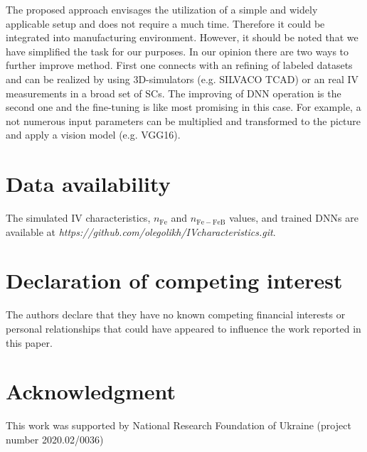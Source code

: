 \documentclass[a4paper,fleqn]{cas-sc}
\begin{document}
The proposed approach envisages
the utilization of a simple and widely applicable setup and
does not require a much time.
Therefore it could be integrated into manufacturing environment.
However, it should be noted that we have simplified the task for our purposes.
In our opinion there are two ways to further improve method.
First one connects with an refining of labeled datasets and can be realized by
using 3D-simulators (e.g. SILVACO TCAD) or an real IV measurements in a broad set of SCs.
The improving of DNN operation is the second one
and the fine-tuning is like most promising in this case.
For example,
a not numerous input parameters can be multiplied and transformed to the picture and
apply a vision model (e.g. VGG16).



\printcredits

\section*{Data availability}

The simulated IV characteristics, $n_\mathrm{Fe}$ and $n_\mathrm{Fe-FeB}$ values,
and trained DNNs are available
at \newline
\emph{https://github.com/olegolikh/IVcharacteristics.git}.

\section*{Declaration of competing interest}

The authors declare that they have no known competing financial interests or personal relationships that could have appeared to influence the work reported in this paper.

\section*{Acknowledgment}


This work was supported by National Research Foundation  of Ukraine
(project number 2020.02/0036)






\end{document}
